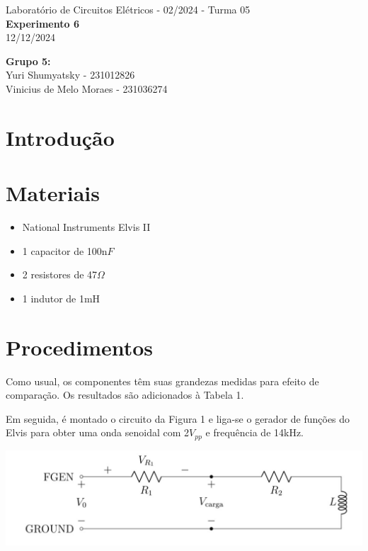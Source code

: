 \documentclass[a4 paper]{article}
\newcommand{\parag}{\hspace{30pt}}
\begin{document}
\justifying
\begin{center}{\large Laboratório de Circuitos Elétricos - 02/2024 - Turma 05}\\
{\large \textbf{Experimento 6}}\\ 
12/12/2024
\end{center}

\vspace{500pt}
 \noindent\textbf{Grupo 5:}\\
 Yuri Shumyatsky - 231012826\\
Vinicius de Melo Moraes - 231036274\\



\vspace{30pt}
\newpage

\section{Introdução}

\vspace{5cm}
\section{Materiais}


	\begin{itemize}
	\item National Instruments Elvis II
	\item 1 capacitor de 100n$F$
	\item 2 resistores de 47$\Omega$
	\item 1 indutor de 1mH
	\end{itemize}

\newpage

\section{Procedimentos}
\parag Como usual, os componentes têm suas grandezas medidas para efeito de comparação. Os resultados são adicionados à Tabela 1.



Em seguida, é montado o circuito da Figura 1 e liga-se o gerador de funções do Elvis para obter uma onda senoidal com 2$V_{pp}$ e frequência de 14kHz.

\begin{table}[h]
\centering
\includegraphics[scale=0.5]{figuras/figura1}
\end{table}
\end{document}
